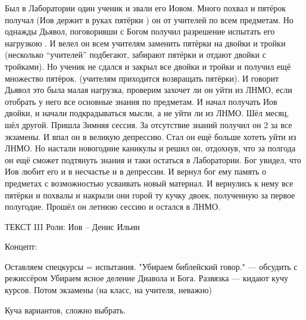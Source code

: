 \documentclass[10pt,a4paper]{article}
\begin{document}
Был в Лаборатории один ученик и звали его Иовом. Много похвал и пятёрок получал (Иов держит в руках пятёрки ) он от учителей по всем предметам. Но однажды Дьявол, поговоривши с Богом получил разрешение испытать его  нагрузкою . И велел он всем учителям заменить пятёрки на двойки и тройки (несколько “учителей” подбегают, забирают пятёрки и отдают двойки с тройками). Но ученик не сдался и закрыл все двойки и тройки и получил ещё множество пятёрок. (учителям приходится возвращать пятёрки).
И говорит Дьявол это была малая нагрузка, проверим захочет ли он уйти из ЛНМО, если отобрать у него все основные знания по предметам.
И начал получать Иов двойки, и начали подкрадываться мысли, а не уйти ли из ЛНМО. Шёл месяц, шёл другой. Пришла Зимняя сессия. За отсутствие знаний получил он 2 за все экзамены. И впал он в великую депрессию. Стал он ещё больше хотеть уйти из ЛНМО. Но настали новогодние каникулы и решил он, отдохнув, что за полгода он ещё сможет подтянуть знания и таки остаться в Лаборатории. Бог увидел, что Иов любит его и в несчастье и в депрессии. И вернул бог ему память о предметах с возможностью усваивать новый материал. И вернулись к нему все пятёрки и похвалы и накрыли они горой ту кучку двоек, полученную за первое полугодие. Прошёл он летнюю сессию и остался в ЛНМО.

ТЕКСТ III
Роли:
Иов -- Денис Ильин


Концепт: 

    Оставляем спецкурсы = испытания.
    "Убираем библейский говор." --- обсудить с режиссёром
    Убираем ясное деление Диавола и Бога.
    Развязка --- кидают кучу курсов. Потом экзамены (на класс, на учителя, неважно)    
    
    Куча вариантов, сложно выбрать.
 
\end{document}

